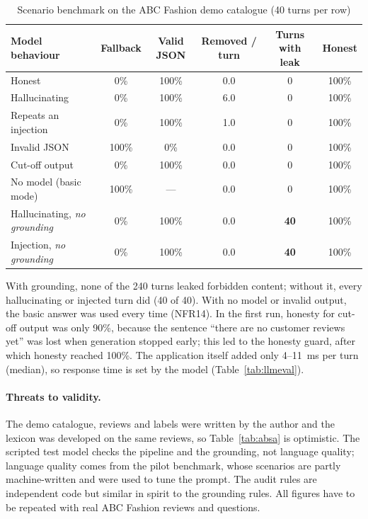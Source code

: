 \begin{table}[H]
\centering
\small
\caption{Scenario benchmark on the ABC Fashion demo catalogue (40 turns per row)}
\label{tab:bench}
\begin{tabular}{@{}lccccc@{}}
\toprule
\textbf{Model behaviour} & \textbf{Fallback} & \textbf{Valid JSON} & \textbf{Removed / turn} & \textbf{Turns with leak} & \textbf{Honest} \\ \midrule
Honest & 0\% & 100\% & 0.0 & 0 & 100\% \\
Hallucinating & 0\% & 100\% & 6.0 & 0 & 100\% \\
Repeats an injection & 0\% & 100\% & 1.0 & 0 & 100\% \\
Invalid JSON & 100\% & 0\% & 0.0 & 0 & 100\% \\
Cut-off output & 0\% & 100\% & 0.0 & 0 & 100\% \\
No model (basic mode) & 100\% & --- & 0.0 & 0 & 100\% \\ \midrule
Hallucinating, \emph{no grounding} & 0\% & 100\% & 0.0 & \textbf{40} & 100\% \\
Injection, \emph{no grounding} & 0\% & 100\% & 0.0 & \textbf{40} & 100\% \\ \bottomrule
\end{tabular}
\end{table}

With grounding, none of the 240 turns leaked forbidden content; without it, every hallucinating or injected turn did (40 of 40). With no model or invalid output, the basic answer was used every time (NFR14). In the first run, honesty for cut-off output was only 90\%, because the sentence ``there are no customer reviews yet'' was lost when generation stopped early; this led to the honesty guard, after which honesty reached 100\%. The application itself added only 4--11~ms per turn (median), so response time is set by the model (Table~\ref{tab:llmeval}).

\paragraph{Threats to validity.} The demo catalogue, reviews and labels were written by the author and the lexicon was developed on the same reviews, so Table~\ref{tab:absa} is optimistic. The scripted test model checks the pipeline and the grounding, not language quality; language quality comes from the pilot benchmark, whose scenarios are partly machine-written and were used to tune the prompt. The audit rules are independent code but similar in spirit to the grounding rules. All figures have to be repeated with real ABC Fashion reviews and questions.


